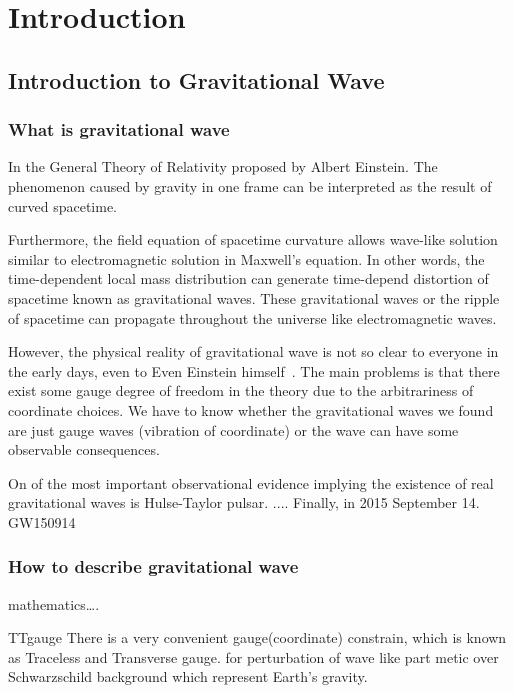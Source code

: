 \documentclass[12pt]{caltech_thesis}
\begin{document}
\tableofcontents
\listoffigures
\listoftables
\printnomenclature

\mainmatter


\chapter{Introduction} 
\section{Introduction to Gravitational Wave}
\subsection{What is gravitational wave}
In the General Theory of Relativity proposed by Albert Einstein. The phenomenon caused by gravity in one frame can be interpreted as the result of curved spacetime.


Furthermore, the field equation of spacetime curvature allows wave-like solution similar to electromagnetic solution in Maxwell’s equation. In other words, the time-dependent local mass distribution can generate time-depend distortion of spacetime known as gravitational waves. These gravitational waves or the ripple of spacetime can propagate throughout the universe like electromagnetic waves.
	
However, the physical reality of gravitational wave is not so clear to everyone in the early days, even to Even Einstein himself~\cite{?}. The main problems is that there exist some gauge degree of freedom in the theory due to the arbitrariness of coordinate choices. We have to know whether the gravitational waves we found are just gauge waves (vibration of coordinate) or the wave can have some observable consequences. 

On of the most important observational evidence implying the existence of real gravitational waves is Hulse-Taylor pulsar.  
....
Finally, in 2015 September 14.
GW150914

\subsection{How to describe gravitational wave}
mathematics….

TTgauge
There is a very convenient gauge(coordinate) constrain, which is known as Traceless and Transverse gauge. 
for perturbation of wave like part metic over Schwarzschild background which represent Earth’s gravity.
\end{document}
